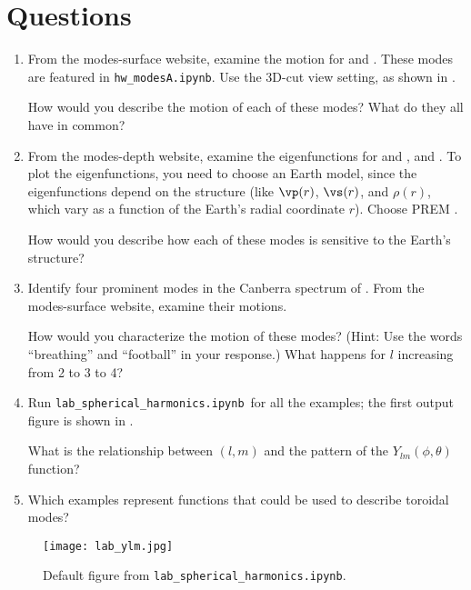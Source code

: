 \documentclass[11pt,titlepage,fleqn]{article}
\newcommand{\tfile}{{\tt lab\_spherical\_harmonics.ipynb}}
\begin{document}
\section*{Questions}

\begin{enumerate}

\item From the modes-surface website, examine the motion for  and . These modes are featured in \verb+hw_modesA.ipynb+. Use the 3D-cut view setting, as shown in .

How would you describe the motion of each of these modes? What do they all have in common?

\vspace{1cm}

\item From the modes-depth website, examine the eigenfunctions for  and , and . To plot the eigenfunctions, you need to choose an Earth model, since the eigenfunctions depend on the structure (like $\vp(r)$, $\vs(r)$, and $\rho(r)$, which vary as a function of the Earth's radial coordinate $r$). Choose PREM \cite{PREM}.

How would you describe how each of these modes is sensitive to the Earth's structure?

\vspace{1cm}

\item Identify four prominent modes in the Canberra spectrum of \citet[][Figure~1]{Park2005}. From the modes-surface website, examine their motions.

How would you characterize the motion of these modes? (Hint: Use the words ``breathing'' and ``football'' in your response.) What happens for $l$ increasing from 2 to 3 to 4?

\vspace{1cm}

\item Run \tfile\ for all the examples; the first output figure is shown in .

What is the relationship between $(l,m)$ and the pattern of the $Y_{lm}(\phi,\theta)$ function?

\vspace{1cm}

\item Which examples represent functions that could be used to describe toroidal modes?

\vspace{1cm}

\end{enumerate}



\begin{figure}[h]
\hspace{-1cm}
\texttt{[image: lab\_ylm.jpg]}
\caption[]
{{
Default figure from \tfile.
}}
\label{fig:ylm}
\end{figure}

\end{document}
